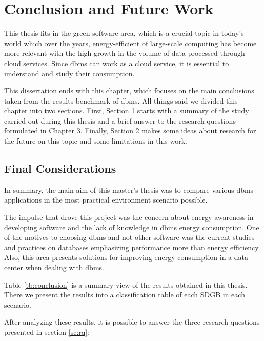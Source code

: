 \chapter{Conclusion and Future Work}
\label{cha:conclusion}

	
	This thesis fits in the green software area, which is a crucial topic in today's world which over the years, energy-efficient of large-scale computing has become more relevant with the high growth in the volume of data processed through cloud services. Since \gls{dbms} can work as a cloud service, it is essential to understand and study their consumption.
	
	This dissertation ends with this chapter, which focuses on the main conclusions taken from the results benchmark of \gls{dbms}.	All things said we divided this chapter into two sections. First, Section 1 starts with a summary of the study carried out during this thesis and a brief answer to the research questions formulated in Chapter 3. Finally, Section 2 makes some ideas about research for the future on this topic and some limitations in this work.
	

\section{Final Considerations}
\label{sc:finalcons}
In summary, the main aim of this master's thesis was to compare various \gls{dbms} applications in the most practical environment scenario possible.

The impulse that drove this project was the concern about energy awareness in developing software and the lack of knowledge in \gls{dbms} energy consumption. One of the motives to choosing \gls{dbms} and not other software was the current studies and practices on databases emphasizing performance more than energy efficiency. Also, this area presents solutions for improving energy consumption in a data center when dealing with \gls{dbms}.


Table \ref{tb:conclusion} is a summary view of the results obtained in this thesis. There we present the results into a classification table of each SDGB in each scenario.


After analyzing these results, it is possible to answer the three research questions presented in section \ref{sc:rq}: 



